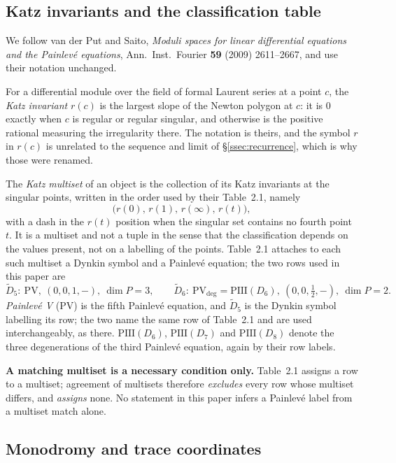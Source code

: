 \subsection{Katz invariants and the classification table}\label{ssec:katz}

We follow van der Put and Saito, \emph{Moduli spaces for linear differential
equations and the Painlev\'e equations}, Ann.\ Inst.\ Fourier \textbf{59} (2009)
2611--2667, and use their notation unchanged.

For a differential module over the field of formal Laurent series at a point
$c$, the \emph{Katz invariant} $r(c)$ is the largest slope of the Newton
polygon at $c$: it is $0$ exactly when $c$ is regular or regular singular, and
otherwise is the positive rational measuring the irregularity there. The
notation is theirs, and the symbol $r$ in $r(c)$ is unrelated to the sequence
and limit of \S\ref{ssec:recurrence}, which is why those were renamed.

The \emph{Katz multiset} of an object is the collection of its Katz invariants
at the singular points, written in the order used by their Table~2.1, namely
\[
  \bigl(r(0),\,r(1),\,r(\infty),\,r(t)\bigr),
\]
with a dash in the $r(t)$ position when the singular set contains no fourth
point $t$. It is a multiset and not a tuple in the sense that the classification
depends on the values present, not on a labelling of the points. Table~2.1
attaches to each such multiset a Dynkin symbol and a Painlev\'e equation; the
two rows used in this paper are
\[
  \widetilde D_5:\ \mathrm{PV},\ (0,0,1,-),\ \dim P=3,
  \qquad
  \widetilde D_6:\ \mathrm{PV}_{\deg}=\mathrm{PIII}(D_6),\ (0,0,\tfrac12,-),\
  \dim P=2 .
\]
\emph{Painlev\'e V} (PV) is the fifth Painlev\'e equation, and $\widetilde D_5$
is the Dynkin symbol labelling its row; the two name the same row of Table~2.1
and are used interchangeably, as there. $\mathrm{PIII}(D_6)$, $\mathrm{PIII}(D_7)$
and $\mathrm{PIII}(D_8)$ denote the three degenerations of the third Painlev\'e
equation, again by their row labels.

\textbf{A matching multiset is a necessary condition only.} Table~2.1 assigns a
row to a multiset; agreement of multisets therefore \emph{excludes} every row
whose multiset differs, and \emph{assigns} none. No statement in this paper
infers a Painlev\'e label from a multiset match alone.

\subsection{Monodromy and trace coordinates}\label{ssec:traces}

